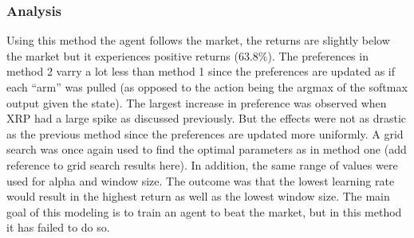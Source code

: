 \documentclass[a4paper,12pt]{article}
\begin{document}
\subsubsection{Analysis}
Using this method the agent follows the market, the returns are slightly below the market but it experiences positive returns (63.8\%). The preferences in method 2 varry a lot less than method 1 since the preferences are updated as if each “arm” was pulled (as opposed to the action being the argmax of the softmax output given the state). The largest increase in preference was observed when XRP had a large spike as discussed previously. But the effects were not as drastic as the previous method since the preferences are updated more uniformly.
A grid search was once again used to find the optimal parameters as in method one (add reference to grid search results here). In addition, the same range of values were used for alpha and window size. The outcome was that the lowest learning rate would result in the highest return as well as the lowest window size. 
The main goal of this modeling is to train an agent to beat the market, but in this method it has failed to do so. 
\end{document}
